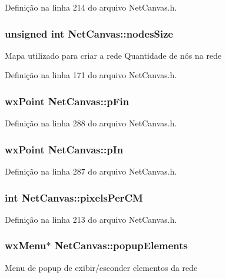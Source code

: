 Definição na linha 214 do arquivo Net\+Canvas.\+h.

\subsubsection[{nodes\+Size}]{\setlength{\rightskip}{0pt plus 5cm}unsigned int Net\+Canvas\+::nodes\+Size}\label{class_net_canvas_a25be12e0c2f7d9e6114f33386dece61c}
Mapa utilizado para criar a rede Quantidade de nós na rede 

Definição na linha 171 do arquivo Net\+Canvas.\+h.

\subsubsection[{p\+Fin}]{\setlength{\rightskip}{0pt plus 5cm}wx\+Point Net\+Canvas\+::p\+Fin}\label{class_net_canvas_a31ab4cbfa92786723007882dad765b10}


Definição na linha 288 do arquivo Net\+Canvas.\+h.

\subsubsection[{p\+In}]{\setlength{\rightskip}{0pt plus 5cm}wx\+Point Net\+Canvas\+::p\+In}\label{class_net_canvas_a058b5bd44a732db185dab5aec321987c}


Definição na linha 287 do arquivo Net\+Canvas.\+h.

\subsubsection[{pixels\+Per\+CM}]{\setlength{\rightskip}{0pt plus 5cm}int Net\+Canvas\+::pixels\+Per\+CM}\label{class_net_canvas_a0fb859d245b23043c44b36dff0198031}


Definição na linha 213 do arquivo Net\+Canvas.\+h.

\subsubsection[{popup\+Elements}]{\setlength{\rightskip}{0pt plus 5cm}wx\+Menu$\ast$ Net\+Canvas\+::popup\+Elements}\label{class_net_canvas_a507584a5848b4ab6d22e155d3ce3598d}
Menu de popup de exibir/esconder elementos da rede 

